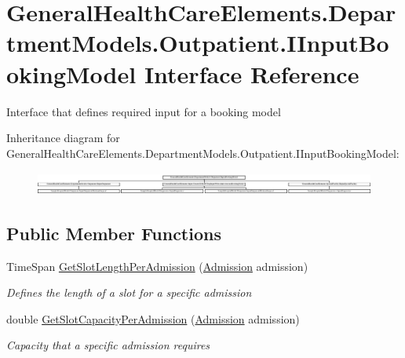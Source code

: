 \hypertarget{interface_general_health_care_elements_1_1_department_models_1_1_outpatient_1_1_i_input_booking_model}{}\section{General\+Health\+Care\+Elements.\+Department\+Models.\+Outpatient.\+I\+Input\+Booking\+Model Interface Reference}
\label{interface_general_health_care_elements_1_1_department_models_1_1_outpatient_1_1_i_input_booking_model}


Interface that defines required input for a booking model  


Inheritance diagram for General\+Health\+Care\+Elements.\+Department\+Models.\+Outpatient.\+I\+Input\+Booking\+Model\+:\begin{figure}[H]
\begin{center}
\leavevmode
\includegraphics[height=0.780669cm]{interface_general_health_care_elements_1_1_department_models_1_1_outpatient_1_1_i_input_booking_model}
\end{center}
\end{figure}
\subsection*{Public Member Functions}
\begin{DoxyCompactItemize}
\item 
Time\+Span \hyperlink{interface_general_health_care_elements_1_1_department_models_1_1_outpatient_1_1_i_input_booking_model_a188a809527d24b4ea6be455ad472234f}{Get\+Slot\+Length\+Per\+Admission} (\hyperlink{class_general_health_care_elements_1_1_treatment_admission_types_1_1_admission}{Admission} admission)
\begin{DoxyCompactList}\small\item\em Defines the length of a slot for a specific admission \end{DoxyCompactList}\item 
double \hyperlink{interface_general_health_care_elements_1_1_department_models_1_1_outpatient_1_1_i_input_booking_model_a0ec886d89cd678a12a4245d09d5b48c0}{Get\+Slot\+Capacity\+Per\+Admission} (\hyperlink{class_general_health_care_elements_1_1_treatment_admission_types_1_1_admission}{Admission} admission)
\begin{DoxyCompactList}\small\item\em Capacity that a specific admission requires \end{DoxyCompactList}\end{DoxyCompactItemize}


